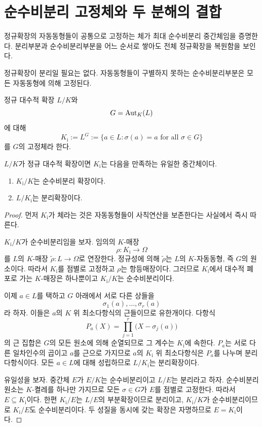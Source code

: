 \clearpage
\section{순수비분리 고정체와 두 분해의 결합}
\label{sec:normal-inseparable-fixed-field}

\begin{learninggoal}
정규확장의 자동동형들이 공통으로 고정하는 체가 최대 순수비분리 중간체임을 증명한다. 분리부분과 순수비분리부분을 어느 순서로 쌓아도 전체 정규확장을 복원함을 보인다.
\end{learninggoal}

정규확장이 분리일 필요는 없다. 자동동형들이 구별하지 못하는 순수비분리부분은 모든 자동동형에 의해 고정된다.

\begin{definition}
정규 대수적 확장 $L/K$와
\[
  G=\operatorname{Aut}_K(L)
\]
에 대해
\[
  K_{\mathrm i}:=L^G
  :=\{a\in L:\sigma(a)=a\text{ for all }\sigma\in G\}
\]
를 $G$의 고정체라 한다.
\end{definition}

\begin{theorem}[순수비분리부분을 먼저 놓는 분해]
$L/K$가 정규 대수적 확장이면 $K_{\mathrm i}$는 다음을 만족하는 유일한 중간체이다.
\begin{enumerate}[label=(\roman*)]
  \item $K_{\mathrm i}/K$는 순수비분리 확장이다.
  \item $L/K_{\mathrm i}$는 분리확장이다.
\end{enumerate}
\end{theorem}

\begin{proof}
먼저 $K_{\mathrm i}$가 체라는 것은 자동동형들이 사칙연산을 보존한다는 사실에서 즉시 따른다.

$K_{\mathrm i}/K$가 순수비분리임을 보자. 임의의 $K$-매장
\[
  \rho:K_{\mathrm i}\longrightarrow\Omega
\]
를 $L$의 $K$-매장 $\widetilde\rho:L\to\Omega$로 연장한다. 정규성에 의해 $\widetilde\rho$는 $L$의 $K$-자동동형, 즉 $G$의 원소이다. 따라서 $K_{\mathrm i}$를 점별로 고정하고 $\rho$는 항등매장이다. 그러므로 $K_{\mathrm i}$에서 대수적 폐포로 가는 $K$-매장은 하나뿐이고 $K_{\mathrm i}/K$는 순수비분리이다.

이제 $a\in L$를 택하고 $G$ 아래에서 서로 다른 상들을
\[
  \sigma_1(a),\dots,\sigma_r(a)
\]
라 하자. 이들은 $a$의 $K$ 위 최소다항식의 근들이므로 유한개이다. 다항식
\[
  P_a(X)=\prod_{j=1}^r\bigl(X-\sigma_j(a)\bigr)
\]
의 근 집합은 $G$의 모든 원소에 의해 순열되므로 그 계수는 $K_{\mathrm i}$에 속한다. $P_a$는 서로 다른 일차인수의 곱이고 $a$를 근으로 가지므로 $a$의 $K_{\mathrm i}$ 위 최소다항식은 $P_a$를 나누며 분리다항식이다. 모든 $a\in L$에 대해 성립하므로 $L/K_{\mathrm i}$는 분리확장이다.

유일성을 보자. 중간체 $E$가 $E/K$는 순수비분리이고 $L/E$는 분리라고 하자. 순수비분리 원소는 $K$-켤레를 하나만 가지므로 모든 $\sigma\in G$가 $E$를 점별로 고정한다. 따라서 $E\subseteq K_{\mathrm i}$이다. 한편 $K_{\mathrm i}/E$는 $L/E$의 부분확장이므로 분리이고, $K_{\mathrm i}/K$가 순수비분리이므로 $K_{\mathrm i}/E$도 순수비분리이다. 두 성질을 동시에 갖는 확장은 자명하므로 $E=K_{\mathrm i}$이다.
\end{proof}

